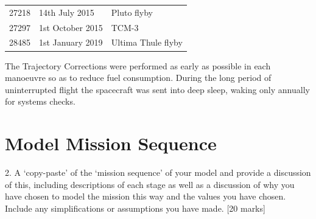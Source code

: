 \documentclass[11pt]{article}
\begin{document}
\begin{table}[H]
\begin{tabular}{cll}
\rowcolor[HTML]{FFD8AD} 
27218                                                          & 14th July 2015                                                                                            & Pluto flyby                                       \\
\rowcolor[HTML]{FFD8AD} 
27297                                                          & 1st October 2015                                                                                          & TCM-3                                             \\
\rowcolor[HTML]{FFB3B3} 
28485                                                          & 1st January 2019                                                                                          & Ultima Thule flyby                                     \\ \hline
\end{tabular}
\label{tab:timeline}
\end{table}

The Trajectory Corrections were performed as early as possible in each manoeuvre so as to reduce fuel consumption.
During the long period of uninterrupted flight the spacecraft was sent into deep sleep, waking only annually for systems checks.


\section{Model Mission Sequence}

2. A ‘copy-paste’ of the ‘mission sequence’ of your model and provide a discussion of this,
including descriptions of each stage as well as a discussion of why you have chosen to
model the mission this way and the values you have chosen. Include any simplifications
or assumptions you have made.
[20 marks]
\end{document}
